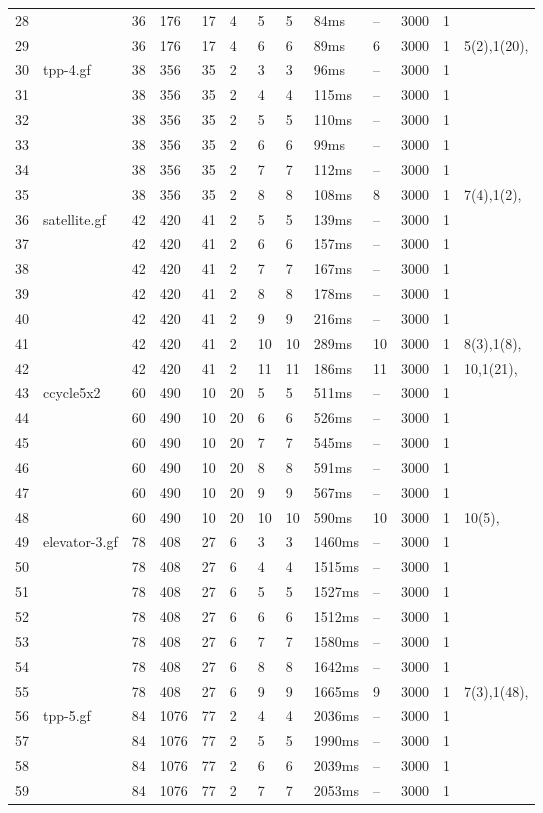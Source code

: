 \documentclass{article}
\begin{document}
\begin{longtable}{|l |l |l |l |l |l |l |l |l |l |l |l |l |}
28&&36&176&17&4&5&5&84ms&--&3000&1&\\
29&&36&176&17&4&6&6&89ms&6&3000&1&5(2),1(20),\\
30&tpp-4.gf&38&356&35&2&3&3&96ms&--&3000&1&\\
31&&38&356&35&2&4&4&115ms&--&3000&1&\\
32&&38&356&35&2&5&5&110ms&--&3000&1&\\
33&&38&356&35&2&6&6&99ms&--&3000&1&\\
34&&38&356&35&2&7&7&112ms&--&3000&1&\\
35&&38&356&35&2&8&8&108ms&8&3000&1&7(4),1(2),\\
36&satellite.gf&42&420&41&2&5&5&139ms&--&3000&1&\\
37&&42&420&41&2&6&6&157ms&--&3000&1&\\
38&&42&420&41&2&7&7&167ms&--&3000&1&\\
39&&42&420&41&2&8&8&178ms&--&3000&1&\\
40&&42&420&41&2&9&9&216ms&--&3000&1&\\
41&&42&420&41&2&10&10&289ms&10&3000&1&8(3),1(8),\\
42&&42&420&41&2&11&11&186ms&11&3000&1&10,1(21),\\
43&ccycle5x2&60&490&10&20&5&5&511ms&--&3000&1&\\
44&&60&490&10&20&6&6&526ms&--&3000&1&\\
45&&60&490&10&20&7&7&545ms&--&3000&1&\\
46&&60&490&10&20&8&8&591ms&--&3000&1&\\
47&&60&490&10&20&9&9&567ms&--&3000&1&\\
48&&60&490&10&20&10&10&590ms&10&3000&1&10(5),\\
49&elevator-3.gf&78&408&27&6&3&3&1460ms&--&3000&1&\\
50&&78&408&27&6&4&4&1515ms&--&3000&1&\\
51&&78&408&27&6&5&5&1527ms&--&3000&1&\\
52&&78&408&27&6&6&6&1512ms&--&3000&1&\\
53&&78&408&27&6&7&7&1580ms&--&3000&1&\\
54&&78&408&27&6&8&8&1642ms&--&3000&1&\\
55&&78&408&27&6&9&9&1665ms&9&3000&1&7(3),1(48),\\
56&tpp-5.gf&84&1076&77&2&4&4&2036ms&--&3000&1&\\
57&&84&1076&77&2&5&5&1990ms&--&3000&1&\\
58&&84&1076&77&2&6&6&2039ms&--&3000&1&\\
59&&84&1076&77&2&7&7&2053ms&--&3000&1&\\

\end{longtable}
\end{document}
